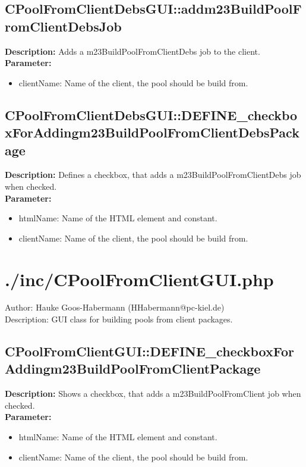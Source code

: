 \subsection{CPoolFromClientDebsGUI::addm23BuildPoolFromClientDebsJob}
\textbf{Description:} Adds a m23BuildPoolFromClientDebs job to the client.\\
\textbf{Parameter:}
\begin{itemize}
\item clientName: Name of the client, the pool should be build from.
\end{itemize}

\subsection{CPoolFromClientDebsGUI::DEFINE\_checkboxForAddingm23BuildPoolFromClientDebsPackage}
\textbf{Description:} Defines a checkbox, that adds a m23BuildPoolFromClientDebs job when checked.\\
\textbf{Parameter:}
\begin{itemize}
\item htmlName: Name of the HTML element and constant.
\item clientName: Name of the client, the pool should be build from.
\end{itemize}

\newpage\section{./inc/CPoolFromClientGUI.php}
 Author: Hauke Goos-Habermann (HHabermann@pc-kiel.de)\\
 Description: GUI class for building pools from client packages.\\

\subsection{CPoolFromClientGUI::DEFINE\_checkboxForAddingm23BuildPoolFromClientPackage}
\textbf{Description:} Shows a checkbox, that adds a m23BuildPoolFromClient job when checked.\\
\textbf{Parameter:}
\begin{itemize}
\item htmlName: Name of the HTML element and constant.
\item clientName: Name of the client, the pool should be build from.
\end{itemize}

